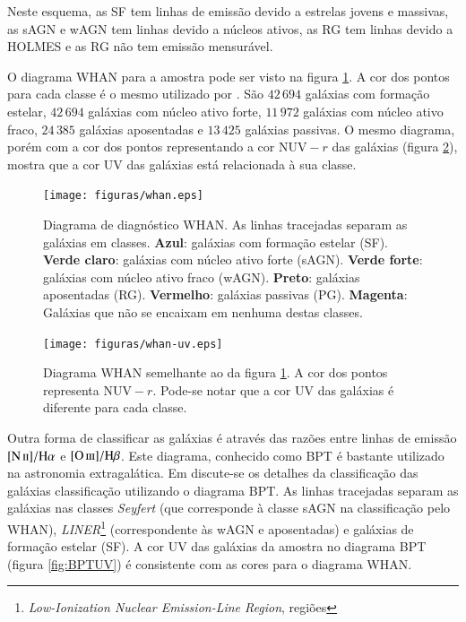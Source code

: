 Neste esquema, as SF tem linhas de emissão devido a estrelas jovens e massivas,
as sAGN e wAGN tem linhas devido a núcleos ativos, as RG tem linhas devido a
HOLMES e as RG não tem emissão mensurável.

O diagrama WHAN para a amostra \starlightUV pode ser visto na figura
\ref{fig:Whan}. A cor dos pontos para cada classe é o mesmo utilizado por
\citet{CidFernandes2011}. São $42\,694$ galáxias com formação estelar, $42\,694$
galáxias com núcleo ativo forte, $11\,972$ galáxias com núcleo ativo fraco,
$24\,385$ galáxias aposentadas e $13\,425$ galáxias passivas. O mesmo diagrama,
porém com a cor dos pontos representando a cor $\mathrm{NUV}-r$ das galáxias
(figura \ref{fig:WhanUV}), mostra que a cor UV das galáxias está relacionada à
sua classe.

\begin{figure}
	\texttt{[image: figuras/whan.eps]}
	\caption[Diagrama de diagnóstico WHAN.]
	{Diagrama de diagnóstico WHAN. As linhas tracejadas separam as galáxias
	em classes. \textbf{Azul}: galáxias com formação estelar (SF). \textbf{Verde
	claro}: galáxias com núcleo ativo forte (sAGN). \textbf{Verde forte}:
	galáxias com núcleo ativo fraco (wAGN). \textbf{Preto}: galáxias aposentadas
	(RG). \textbf{Vermelho}: galáxias passivas (PG). \textbf{Magenta}: Galáxias
	que não se encaixam em nenhuma destas classes.}
	\label{fig:Whan}
\end{figure}

\begin{figure}
	\texttt{[image: figuras/whan-uv.eps]}
	\caption[Cores UV no diagrama WHAN.]
	{Diagrama WHAN semelhante ao da figura \ref{fig:Whan}. A cor dos pontos
	representa $\mathrm{NUV}-r$. Pode-se notar que a cor UV das galáxias é
	diferente para cada classe.}
	\label{fig:WhanUV}
\end{figure}

Outra forma de classificar as galáxias é através das razões entre linhas de
emissão $\nII/\Halpha$ e $\oIII/\Hbeta$. Este diagrama, conhecido como BPT
\citep{Baldwin1981} é bastante utilizado na astronomia extragalática. Em
\citet{CidFernandes2010} discute-se os detalhes da classificação das galáxias
classificação utilizando o diagrama BPT. As linhas tracejadas separam as
galáxias nas classes {\em Seyfert} (que corresponde à classe sAGN na
classificação pelo WHAN), {\em LINER}\footnote{{\em Low-Ionization Nuclear
Emission-Line Region}, regiões} (correspondente às wAGN e aposentadas) e
galáxias de formação estelar (SF). A cor UV das galáxias da amostra no diagrama BPT (figura
\ref{fig:BPTUV}) é consistente com as cores para o diagrama WHAN.


